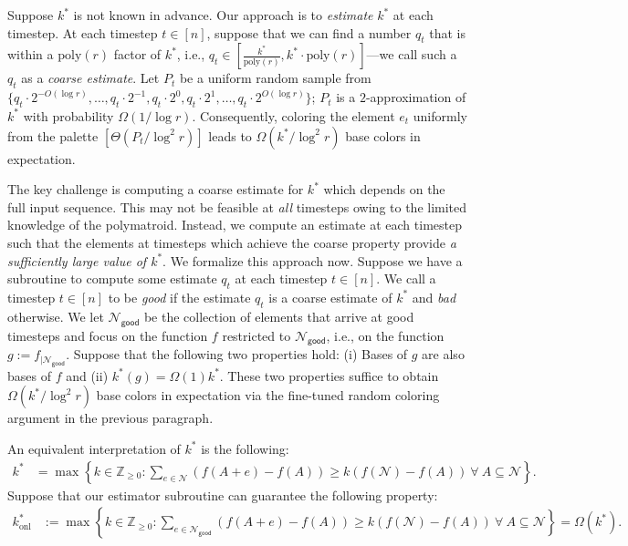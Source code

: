 \documentclass[11pt]{article}
\theoremstyle{definition}
\newcommand{\calN}{{\mathcal{N}}}
\newcommand{\good}{\mathsf{good}}
\newcommand{\Z}{\mathbb{Z}}
\begin{document}
Suppose $k^*$ is not known in advance. Our approach is to \emph{estimate} $k^*$ at each timestep. 
At each timestep $t\in [n]$, suppose that we can 
find a number $q_t$ that is within a $\text{poly}(r)$ factor of $k^*$, i.e., $q_t\in [\frac{k^*}{\text{poly}(r)}, k^*\cdot \text{poly}(r)]$---we 
call such a $q_t$ as a \emph{coarse estimate}.  Let $P_t$ be a uniform random sample from $\{q_t\cdot 2^{-O(\log r)}, \ldots, q_t\cdot 2^{-1}, q_t\cdot 2^0, q_t\cdot 2^{1}, \ldots, q_t\cdot 2^{O(\log r)}\}$; $P_t$ is a $2$-approximation of $k^*$ with probability $\Omega(1/\log r)$. Consequently, 
coloring the element $e_t$ uniformly from the palette $[\Theta(P_t/\log^2 r)]$ leads to $\Omega(k^*/ \log^2 r)$ base colors in 
expectation. 


The key challenge is computing a coarse estimate for $k^*$ which depends on the full input sequence. 
This may not be feasible at \emph{all} timesteps owing to the limited knowledge of the polymatroid.  
Instead, we compute an estimate at each timestep such that the elements at timesteps which achieve the coarse property provide \emph{a sufficiently large value of $k^*$}. We formalize this approach now. 
Suppose we have a subroutine to compute some estimate $q_t$ at each timestep $t\in [n]$. 
We call a timestep $t\in [n]$ to be \emph{good} if the estimate $q_t$ is a coarse estimate of $k^*$ and \emph{bad} otherwise.
We let $\mathcal{N}_{\good}$ be the collection of elements that arrive at good timesteps and focus on the function $f$ restricted to $\calN_{\good}$, i.e., on the function $g:=f_{|\calN_{\good}}$. Suppose that the following two properties hold: (i) Bases of $g$ are also bases of $f$ and (ii) $k^*(g)=\Omega(1) k^*$. 
These two properties suffice to obtain $\Omega(k^*/\log^2{r})$ base colors in expectation via the fine-tuned random coloring argument in the previous paragraph.
\iffalse
We recall that 
\begin{align*}
k^*&= \min_{A\subseteq \calN:\ f(A)<f(\calN)} \left \lfloor\frac{\sum_{e\in \calN}(f(A+e)-f(A))}{f(\calN)-f(A)}\right \rfloor. 
\end{align*}
\fi
\iffalse
An equivalent interpretation of $k^*$ is the following: 
\begin{align}
    k^* &= \max\left\{k\in \Z_{\ge 0}: \sum_{e\in \calN}\left(f(A+e)-f(A)\right) \ge k(f(\calN)-f(A))\ \forall\ A\subseteq \calN\right\}. 
\label{equality:technique-alternative-intepretation-k*}
\end{align}
Suppose that our estimator subroutine can guarantee the following property: \begin{align}
    k_{\text{onl}}^* &:= \max\left\{k\in \Z_{\ge 0}: \sum_{e\in \calN_{\good}}(f(A+e)-f(A)) \ge k(f(\calN)-f(A))\ \forall\ A\subseteq \calN \right\}=\Omega(k^*).
    \label{equality:technique-target}
\end{align}
\end{document}
